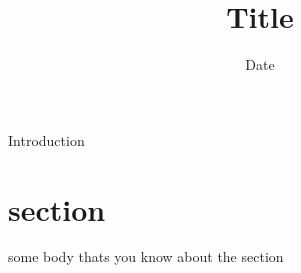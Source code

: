 \documentclass{article}
\title{Title}
\author{}
\date{Date}
\begin{document}

\maketitle

Introduction

\section{section}

some body thats you know about the section

\bigskip

\end{document}

